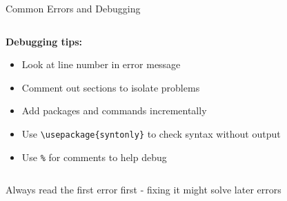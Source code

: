 \begin{frame}[fragile]{Common Errors and Debugging}
\begin{columns}
\begin{column}{0.5\textwidth}
                    \textbf{Debugging tips:}
                    \begin{itemize}
                         \item Look at line number in error message
                         \item Comment out sections to isolate problems
                         \item Add packages and commands incrementally
                         \item Use \texttt{\textbackslash usepackage\{syntonly\}} to check syntax without output
                         \item Use \texttt{\%} for comments to help debug
                    \end{itemize}
               \end{column}
          \end{columns}
          
          \begin{warning}
               Always read the first error first - fixing it might solve later errors
          \end{warning}
     \end{frame}
     
